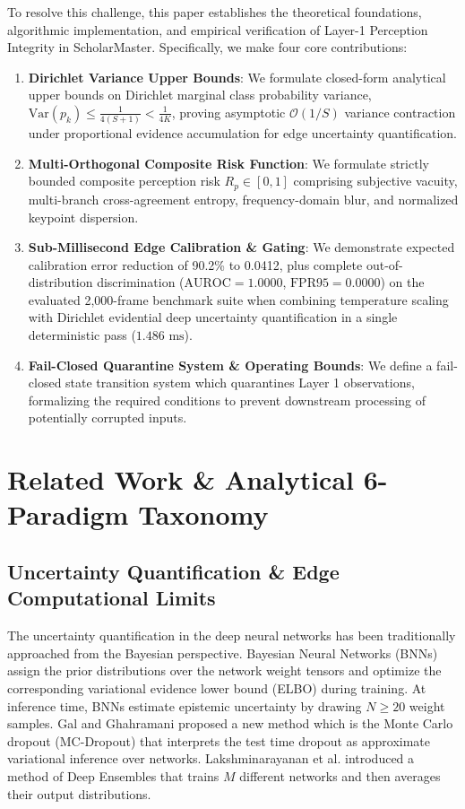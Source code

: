 \documentclass[conference]{IEEEtran}
\begin{document}
To resolve this challenge, this paper establishes the theoretical foundations, algorithmic implementation, and empirical verification of Layer-1 Perception Integrity in ScholarMaster. Specifically, we make four core contributions:
\begin{enumerate}
    \item \textbf{Dirichlet Variance Upper Bounds}: We formulate closed-form analytical upper bounds on Dirichlet marginal class probability variance, $\mathrm{Var}(p_k) \le \frac{1}{4(S+1)} < \frac{1}{4K}$, proving asymptotic $\mathcal{O}(1/S)$ variance contraction under proportional evidence accumulation for edge uncertainty quantification.
    \item \textbf{Multi-Orthogonal Composite Risk Function}: We formulate strictly bounded composite perception risk $R_p \in [0, 1]$ comprising subjective vacuity, multi-branch cross-agreement entropy, frequency-domain blur, and normalized keypoint dispersion.
    \item \textbf{Sub-Millisecond Edge Calibration \& Gating}: We demonstrate expected calibration error reduction of 90.2\% to 0.0412, plus complete out-of-distribution discrimination ($\text{AUROC} = 1.0000$, $\text{FPR95} = 0.0000$) on the evaluated 2,000-frame benchmark suite when combining temperature scaling with Dirichlet evidential deep uncertainty quantification in a single deterministic pass ($1.486\text{ ms}$).
    \item \textbf{Fail-Closed Quarantine System \& Operating Bounds}: We define a fail-closed state transition system which quarantines Layer 1 observations, formalizing the required conditions to prevent downstream processing of potentially corrupted inputs.
\end{enumerate}

\section{Related Work \& Analytical 6-Paradigm Taxonomy}
\subsection{Uncertainty Quantification \& Edge Computational Limits}
The uncertainty quantification in the deep neural networks has been traditionally approached from the Bayesian perspective. Bayesian Neural Networks (BNNs) \cite{blundell2015weight, neal1995bayesian} assign the prior distributions over the network weight tensors and optimize the corresponding variational evidence lower bound (ELBO) during training. At inference time, BNNs estimate epistemic uncertainty by drawing $N \ge 20$ weight samples. Gal and Ghahramani \cite{gal2016dropout} proposed a new method which is the Monte Carlo dropout (MC-Dropout) that interprets the test time dropout as approximate variational inference over networks. Lakshminarayanan et al. \cite{lakshminarayanan2017simple} introduced a method of Deep Ensembles that trains $M$ different networks and then averages their output distributions.
\end{document}
